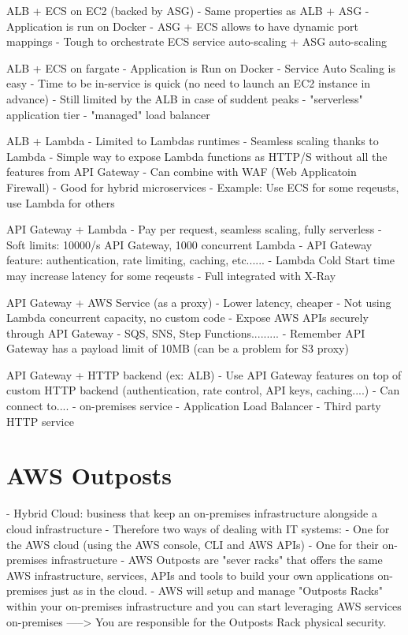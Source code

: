 \documentclass[11pt]{book}
\begin{document}
    ALB + ECS on EC2 (backed by ASG)
    - Same properties as ALB + ASG
    - Application is run on Docker
    - ASG + ECS allows to have dynamic port mappings
    - Tough to orchestrate ECS service auto-scaling + ASG auto-scaling

    ALB + ECS on fargate
    - Application is Run on Docker
    - Service Auto Scaling is easy
    - Time to be in-service is quick (no need to launch an EC2 instance in advance)
    - Still limited by the ALB in case of suddent peaks
    - "serverless" application tier
    - "managed" load balancer

    ALB + Lambda
    - Limited to Lambdas runtimes
    - Seamless scaling thanks to Lambda
    - Simple way to expose Lambda functions as HTTP/S without all the features from API Gateway
    - Can combine with WAF (Web Applicatoin Firewall)
    - Good for hybrid microservices
    - Example: Use ECS for some reqeusts, use Lambda for others

    API Gateway + Lambda
    - Pay per request, seamless scaling, fully serverless
    - Soft limits: 10000/s API Gateway, 1000 concurrent Lambda
    - API Gateway feature: authentication, rate limiting, caching, etc......
    - Lambda Cold Start time may increase latency for some reqeusts
    - Full integrated with X-Ray

    API Gateway + AWS Service (as a proxy)
    - Lower latency, cheaper
    - Not using Lambda concurrent capacity, no custom code
    - Expose AWS APIs securely through API Gateway
    - SQS, SNS, Step Functions.........
    - Remember API Gateway has a payload limit of 10MB (can be a problem for S3 proxy)

    API Gateway + HTTP backend (ex: ALB)
    - Use API Gateway features on top of custom HTTP backend (authentication, rate control, API keys, caching....)
    - Can connect to....
    - on-premises service
    - Application Load Balancer
    - Third party HTTP service

    \section{AWS Outposts}
    - Hybrid Cloud: business that keep an on-premises infrastructure alongside a cloud infrastructure
    - Therefore two ways of dealing with IT systems:
        - One for the AWS cloud (using the AWS console, CLI and AWS APIs)
        - One for their on-premises infrastructure
    - AWS Outposts are "sever racks" that offers the same AWS infrastructure, services, APIs and tools to build your own applications on-premises just as in the cloud.
    - AWS will setup and manage "Outposts Racks" within your on-premises infrastructure and you can start leveraging AWS services on-premises
    -----> You are responsible for the Outposts Rack physical security.
\end{document}
